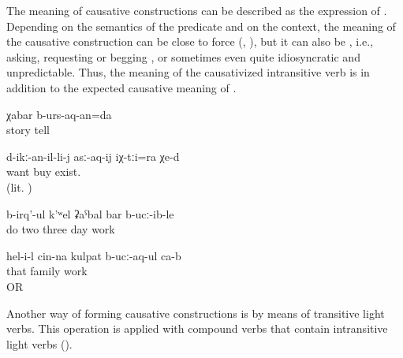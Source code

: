 The meaning of causative constructions can be described as the expression of  \citep{Kulikov2011}. Depending on the semantics of the predicate and on the context, the meaning of the causative construction can be close to force (, ), but it can also be , i.e., asking, requesting or begging , or sometimes even quite idiosyncratic and unpredictable. Thus, the meaning of the causativized intransitive verb   is   in addition to the expected causative meaning of .
%
\begin{exe}
	\ex	\label{ex:‎We will ask for telling the story}
	\gll	χabar	b-urs-aq-an=da\\
		story	tell\\
	\glt	{}

	\ex	\label{ex:‎They are also for those who want to buy them}
	\gll	d-ikː-an-il-li-j	asː-aq-ij	iχ-tːi=ra	χe-d\\
		want	buy  exist.\\
	\glt	{} (lit. )

	\ex	\label{ex:‎‎‎(they were) building, working for three days}
	\gll	b-irq'-ul	k'ʷel	ʡaˁbal	bar	b-ucː-ib-le\\
		do	two	three	day	work\\
	\glt	{}

	\ex	\label{ex:He feeds his family (he sustains his family working)}
	\gll	hel-i-l	cin-na	kulpat	b-ucː-aq-ul ca-b\\
		that		family	work \\
	\glt	{} OR 
\end{exe}

Another way of forming causative constructions is by means of transitive light verbs. This operation is applied with compound verbs that contain intransitive light verbs ().



